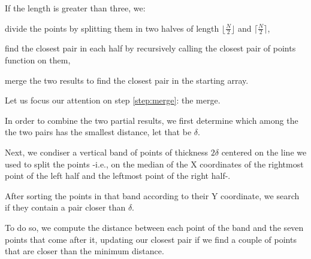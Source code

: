If the length is greater than three, we:
\begin{inlinelist}
    \item divide the points by splitting them in two halves of length $\lfloor \frac{N}{2} \rfloor$ and $\lceil \frac{N}{2} \rceil$,
    \item find the closest pair in each half by recursively calling the closest pair of points function on them,
    \item merge the two results to find the closest pair in the starting array. \label{step:merge}
\end{inlinelist}

Let us focus our attention on step \ref{step:merge}: the merge.

In order to combine the two partial results, we first determine which among the the two pairs has the smallest distance, let that be $\delta$.

Next, we condiser a vertical band of points of thickness $2\delta$ centered on the line we used to split the points -i.e., on the median of the X coordinates of the rightmost point of the left half and the leftmost point of the right half-.

After sorting the points in that band according to their Y coordinate, we search if they contain a pair closer than $\delta$.

To do so, we compute the distance between each point of the band and the seven points that come after it,
updating our closest pair if we find a couple of points that are closer than the minimum distance\cite{lingqi}.

